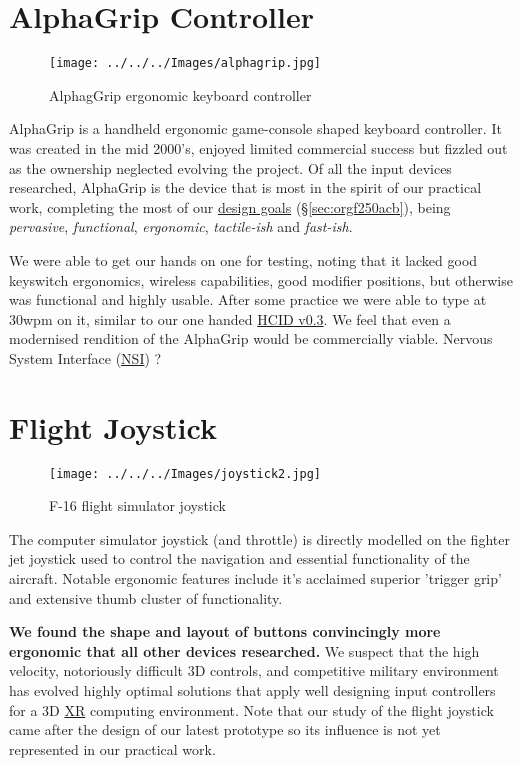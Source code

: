 \documentclass[logo,bsc,singlespacing,parskip]{infthesis}
\begin{document}
\chapter{AlphaGrip Controller}
\label{sec:org1b6f9a0}
\begin{figure}[h]
\centering
\texttt{[image: ../../../Images/alphagrip.jpg]}
\caption{AlphagGrip ergonomic keyboard controller}
\end{figure}

AlphaGrip is a handheld ergonomic game-console shaped keyboard controller.
It was created in the mid 2000's, enjoyed limited commercial success but fizzled out as the ownership neglected evolving the project.
Of all the input devices researched, AlphaGrip is the device that is most in the spirit of our practical work, completing the most of our \hyperref[sec:orgf250acb]{design goals} (\S \ref{sec:orgf250acb}), being \emph{pervasive}, \emph{functional}, \emph{ergonomic}, \emph{tactile-ish} and \emph{fast-ish}.

We were able to get our hands on one for testing, noting that it lacked good keyswitch ergonomics, wireless capabilities, good modifier positions, but otherwise was functional and highly usable.
After some practice we were able to type at 30wpm on it, similar to our one handed \hyperref[sec:org25f7bc2]{HCID v0.3}.
We feel that even a modernised rendition of the AlphaGrip would be commercially viable.
Nervous System Interface (\hyperref[orgf403bf3]{NSI}) ?
\chapter{Flight Joystick}
\label{sec:org69f16d7}
\begin{figure}[h]
\centering
\texttt{[image: ../../../Images/joystick2.jpg]}
\caption{F-16 flight simulator joystick}
\end{figure}

The computer simulator joystick (and throttle) is directly modelled on the fighter jet joystick used to control the navigation and essential functionality of the aircraft.
Notable ergonomic features include it's acclaimed superior 'trigger grip' and extensive thumb cluster of functionality.

\textbf{We found the shape and  layout of buttons convincingly more ergonomic that all other devices researched.}
We suspect that the high velocity, notoriously difficult 3D controls, and competitive military environment has evolved highly optimal solutions that apply well designing input controllers for a 3D \hyperref[org39cbd51]{XR} computing environment.
Note that our study of the flight joystick came after the design of our latest prototype so its influence is not yet represented in our practical work.
\end{document}
